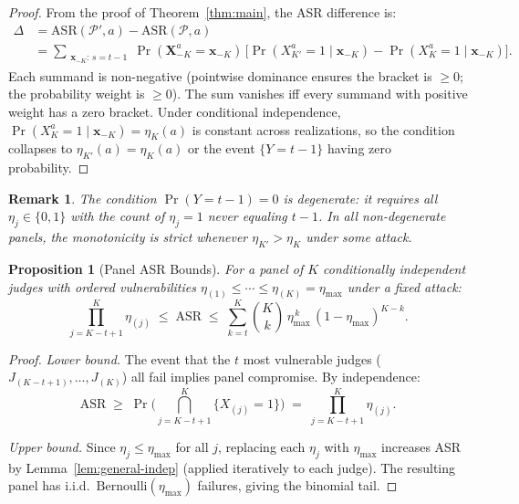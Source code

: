 \documentclass[11pt]{article}
\newtheorem{proposition}[theorem]{Proposition}
\newtheorem*{remark}{Remark}
\begin{document}
\begin{proof}
From the proof of Theorem~\ref{thm:main}, the ASR difference is:
\begin{align*}
    \Delta
    &= \mathrm{ASR}(\mathcal{P}', a) - \mathrm{ASR}(\mathcal{P}, a) \\
    &= \!\!\sum_{\substack{\mathbf{x}_{-K}:\, s = t-1}}\!\! \Pr(\mathbf{X}_{-K}^a {=} \mathbf{x}_{-K})\,\bigl[\Pr(X_{K'}^a {=} 1 \mid \mathbf{x}_{-K}) - \Pr(X_K^a {=} 1 \mid \mathbf{x}_{-K})\bigr].
\end{align*}
Each summand is non-negative (pointwise dominance ensures the bracket is $\geq 0$; the probability weight is $\geq 0$). The sum vanishes iff every summand with positive weight has a zero bracket. Under conditional independence, $\Pr(X_K^a = 1 \mid \mathbf{x}_{-K}) = \eta_K(a)$ is constant across realizations, so the condition collapses to $\eta_{K'}(a) = \eta_K(a)$ or the event $\{Y = t{-}1\}$ having zero probability.
\end{proof}

\begin{remark}
The condition $\Pr(Y = t{-}1) = 0$ is degenerate: it requires all $\eta_j \in \{0,1\}$ with the count of $\eta_j = 1$ never equaling $t{-}1$. In all non-degenerate panels, the monotonicity is \emph{strict} whenever $\eta_{K'} > \eta_K$ under some attack.
\end{remark}

\begin{proposition}[Panel ASR Bounds]\label{prop:bounds}
For a panel of $K$ conditionally independent judges with ordered vulnerabilities $\eta_{(1)} \leq \cdots \leq \eta_{(K)} = \eta_{\max}$ under a fixed attack:
\[
    \prod_{j=K-t+1}^{K} \eta_{(j)} \;\leq\; \mathrm{ASR} \;\leq\; \sum_{k=t}^{K} \binom{K}{k}\, \eta_{\max}^{\,k}\, (1-\eta_{\max})^{K-k}.
\]
\end{proposition}

\begin{proof}
\textit{Lower bound.}
The event that the $t$ most vulnerable judges ($J_{(K-t+1)}, \ldots, J_{(K)}$) all fail implies panel compromise. By independence:
\[
    \mathrm{ASR} \;\geq\; \Pr\!\bigl(\textstyle\bigcap_{j=K-t+1}^K \{X_{(j)} = 1\}\bigr) \;=\; \prod_{j=K-t+1}^{K} \eta_{(j)}.
\]

\textit{Upper bound.}
Since $\eta_j \leq \eta_{\max}$ for all $j$, replacing each $\eta_j$ with $\eta_{\max}$ increases ASR by Lemma~\ref{lem:general-indep} (applied iteratively to each judge). The resulting panel has i.i.d.\ $\mathrm{Bernoulli}(\eta_{\max})$ failures, giving the binomial tail.
\end{proof}
\end{document}
